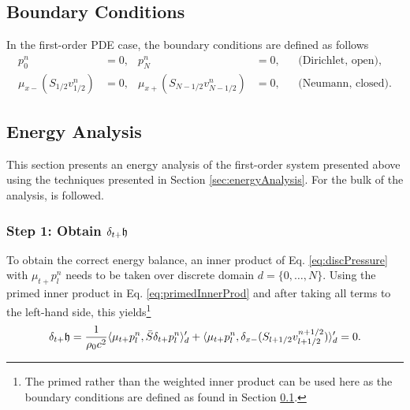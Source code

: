 {\subsection{Boundary Conditions}\label{sec:boundariesFirstOrder}
In the first-order PDE case, the boundary conditions are defined as follows
\begin{subequations}
    \begin{align}\label{eq:firstOrderBoundaryConditions}
        p_0^n &= 0, & p_N^n &= 0, & &\text{(Dirichlet, open),}\\
        \mu_{x-}(S_{1/2}v_{1/2}^n) &= 0, & \mu_{x+}(S_{N-1/2}v_{N-1/2}^n) &= 0, & &\text{(Neumann, closed)}.
    \end{align}
\end{subequations}

\subsection{Energy Analysis}
This section presents an energy analysis of the first-order system presented above using the techniques presented in Section \ref{sec:energyAnalysis}. For the bulk of the analysis, \cite{Harrison2018} is followed. 

\subsubsection{Step 1: Obtain $\delta_{t+} \mathfrak{h}$}
To obtain the correct energy balance, an inner product of Eq. \eqref{eq:discPressure} with $\mu_{t+}p_l^n$ needs to be taken over discrete domain $d = \{0, \hdots, N\}$. Using the primed inner product in Eq. \eqref{eq:primedInnerProd} and after taking all terms to the left-hand side, this yields\footnote{The primed rather than the weighted inner product can be used here as the boundary conditions are defined as found in Section \ref{sec:boundariesFirstOrder}.}
\begin{equation}\label{eq:firstOrderPrimed}
    \delta_{t+}\mathfrak{h} = \frac{1}{\rho_0 c^2}\langle \mu_{t+}p_l^n, \bar{S} \delta_{t+}p_l^n \rangle_{d}' +\langle \mu_{t+}p_l^n, \delta_{x-}(S_{l+1/2}v_{l+1/2}^{n+1/2})\rangle_{d}' = 0.
\end{equation}
}
